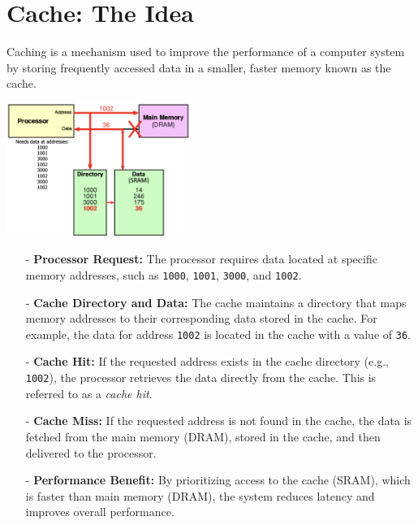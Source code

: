 \section{Cache: The Idea}
Caching is a mechanism used to improve the performance of a computer system by storing frequently accessed data in a smaller, faster memory known as the cache. 
\begin{center}
    \includegraphics[width=0.45\textwidth]{chapters/chapter3a/images/cache.png}
\end{center}
\begin{itemize}
    \item[-] \textbf{Processor Request:} The processor requires data located at specific memory addresses, such as \texttt{1000}, \texttt{1001}, \texttt{3000}, and \texttt{1002}.
    \item[-] \textbf{Cache Directory and Data:} The cache maintains a directory that maps memory addresses to their corresponding data stored in the cache. For example, the data for address \texttt{1002} is located in the cache with a value of \texttt{36}.
    \item[-] \textbf{Cache Hit:} If the requested address exists in the cache directory (e.g., \texttt{1002}), the processor retrieves the data directly from the cache. This is referred to as a \textit{cache hit}.
    \item[-] \textbf{Cache Miss:} If the requested address is not found in the cache, the data is fetched from the main memory (DRAM), stored in the cache, and then delivered to the processor.
    \item[-] \textbf{Performance Benefit:} By prioritizing access to the cache (SRAM), which is faster than main memory (DRAM), the system reduces latency and improves overall performance.
\end{itemize}


